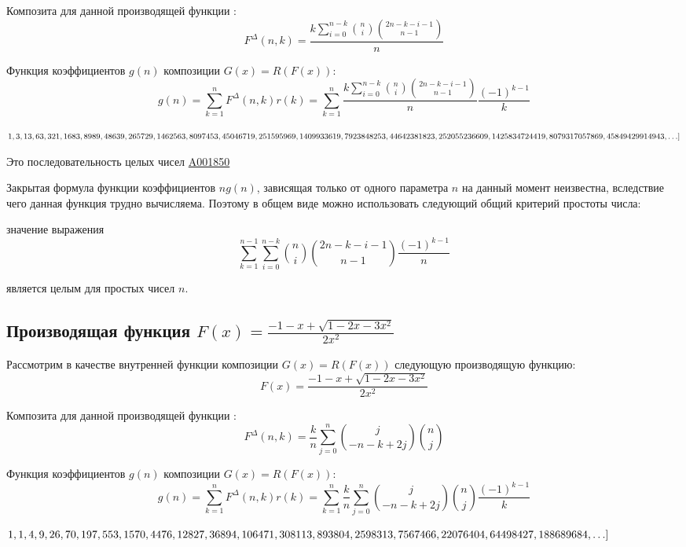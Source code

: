 \documentclass[
russian,
cp1251,
14pt,
simple
]{eskdtext}
\theoremstyle{definition}
\begin{document}
Композита для данной производящей функции \cite{KruchininVV}:
$$
F^\Delta(n,k)=\frac{k \sum_{i=0}^{n-k}{{n \choose i} {2n-k-i-1 \choose n-1}}}{n}
$$

Функция коэффициентов $g(n)$ композиции $G(x)=R(F(x))$:
$$
g(n)=\sum_{k=1}^{n}{F^\Delta(n,k) r(k)}=\sum_{k=1}^{n}{\frac{k \sum_{i=0}^{n-k}{{n \choose i} {2n-k-i-1 \choose n-1}}}{n} \frac{(-1)^{k-1}}{k}}
$$

\begin{math}
1,3,13,63,321,1683,8989,48639,265729,1462563,8097453,45046719,\\
251595969,1409933619,7923848253,44642381823,252055236609,\\
1425834724419,8079317057869,45849429914943,\ldots]
\end{math}

Это последовательность целых чисел \href{http://oeis.org/A001850}{A001850} \cite{oeis}

Закрытая формула функции коэффициентов $ng(n)$, зависящая только от одного параметра $n$ на данный момент неизвестна, вследствие чего данная функция трудно вычисляема. Поэтому в общем виде можно использовать следующий общий критерий простоты числа:

значение выражения
$$
\sum_{k=1}^{n-1}{\sum_{i=0}^{n-k}{{n \choose i} {2n-k-i-1 \choose n-1}} \frac{(-1)^{k-1}}{n}}
$$

является целым для простых чисел $n$.

\subsection{Производящая функция $F(x)=\frac{-1-x+\sqrt{1-2x-3x^2}}{2x^2}$}
Рассмотрим в качестве внутренней функции композиции $G(x)=R(F(x))$ следующую производящую функцию:
$$
F(x)=\frac{-1-x+\sqrt{1-2x-3x^2}}{2x^2}
$$

Композита для данной производящей функции \cite{KruchininVV}:
$$
F^\Delta(n,k)=\frac{k}{n} \sum_{j=0}^{n}{{j \choose -n-k+2j} {n \choose j}}
$$

Функция коэффициентов $g(n)$ композиции $G(x)=R(F(x))$:
$$
g(n)=\sum_{k=1}^{n}{F^\Delta(n,k) r(k)}=\sum_{k=1}^{n}{\frac{k}{n} \sum_{j=0}^{n}{{j \choose -n-k+2j} {n \choose j}} \frac{(-1)^{k-1}}{k}}
$$

\begin{math}
1,1,4,9,26,70,197,553,1570,4476,12827,36894,106471,308113,893804,\\
2598313,7567466,22076404,64498427,188689684,\ldots]
\end{math}
\end{document}
